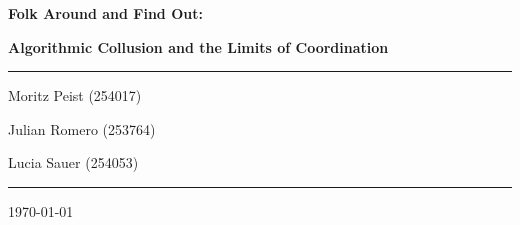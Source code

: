 \documentclass[12pt]{article}
\begin{document}
\begin{titlepage}
	\centering
	\par\vspace{1cm}
	{\huge\bfseries Folk Around and Find Out:\par}
    {\large\bfseries Algorithmic Collusion and the Limits of Coordination\par}
	\vspace{1cm}
    \noindent\rule{\textwidth}{1pt}
    {\Large Moritz Peist (254017)\par}
    {\Large Julian Romero (253764)\par}
    {\Large Lucia Sauer (254053)\par}
    \noindent\rule{\textwidth}{1pt}
    \vfill
    \begin{abstract}
        \noindent
        The Folk Theorem establishes that collusion can be sustained in repeated interactions, yet empirical evidence suggests coordination becomes more difficult as market participants increase. This thesis presents the first test of whether Large Language Model (LLM) agents exhibit this pattern. In controlled experiments with 2-5 competing agents, we find LLM coordination erodes predictably with competition. Our results show a 3.7\% reduction in equilibrium price for each additional firm (p < 0.001), with prices declining smoothly. This culminates in a 10.6\% total price reduction from duopoly to five-agent markets, providing quantitative evidence on algorithmic collusion boundaries in the AI era.
    \end{abstract}
	\vfill
	{\large \today\par}
\end{titlepage}

\tableofcontents
\thispagestyle{empty}

\newpage
\addtocounter{page}{-1}







\newpage
\printbibliography[heading=bibintoc,title={References}]

\newpage

\end{document}
